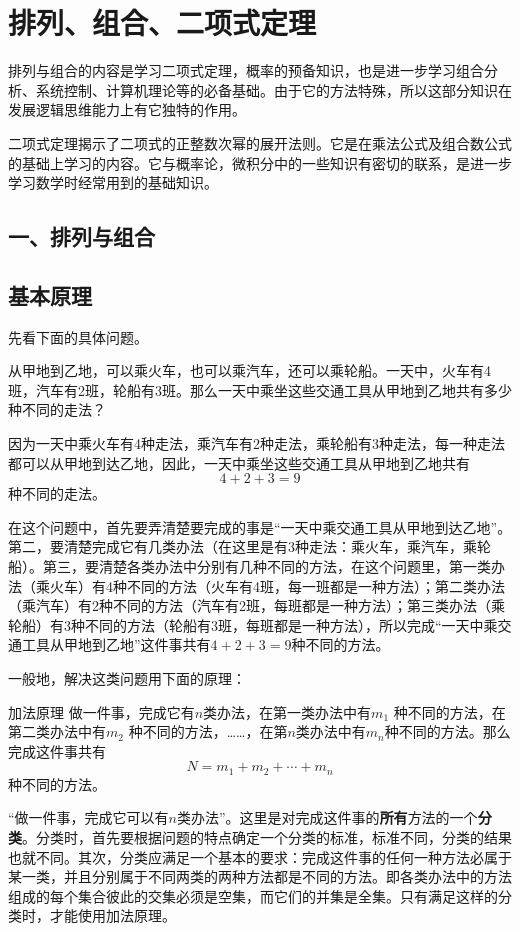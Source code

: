 

\chapter{排列、组合、二项式定理}


排列与组合的内容是学习二项式定理，概率的预备知识，也是进一步学习组合分析、系统控制、计算机理论等的必备基础。由于它的方法特殊，所以这部分知识在发展逻辑思维能力上有它独特的作用。

二项式定理揭示了二项式的正整数次幂的展开法则。它是在乘法公式及组合数公式的基础上学习的内容。它与概率论，微积分中的一些知识有密切的联系，是进一步学习数学时经常用到的基础知识。

\section*{一、排列与组合}

\section{基本原理}

先看下面的具体问题。

从甲地到乙地，可以乘火车，也可以乘汽车，还可以乘轮船。一天中，火车有4班，汽车有2班，轮船有3班。那么一天中乘坐这些交通工具从甲地到乙地共有多少种不同的走法？

因为一天中乘火车有4种走法，乘汽车有2种走法，乘轮船有3种走法，每一种走法都可以从甲地到达乙地，因此，一天中乘坐这些交通工具从甲地到乙地共有
$$4+2+3=9$$种不同的走法。

在这个问题中，首先要弄清楚要完成的事是“一天中乘交通工具从甲地到达乙地”。第二，要清楚完成它有几类办法（在这里是有3种走法：乘火车，乘汽车，乘轮船）。第三，要清楚各类办法中分别有几种不同的方法，在这个问题里，第一类办法（乘火车）有4种不同的方法（火车有4班，每一班都是一种方法）；第二类办法（乘汽车）有2种不同的方法（汽车有2班，每班都是一种方法）；第三类办法（乘轮船）有3种不同的方法（轮船有3班，每班都是一种方法），所以完成“一天中乘交通工具从甲地到乙地”这件事共有$4+2+3  =9$种不同的方法。

一般地，解决这类问题用下面的原理：

\begin{thm}
{加法原理} 做一件事，完成它有$n$类办法，在第一类办法中有$m_{1}$ 种不同的方法，在第二类办法中有$m_{2}$ 种不同的方法，……，在第$n$类办法中有$m_{n}$种不同的方法。那么完成这件事共有    
\[N=m_{1}+m_{2}+\cdots +m_{n}\]
种不同的方法。
\end{thm}

\begin{remark}
“做一件事，完成它可以有$n$类办法”。这里是对完成这件事的\textbf{所有}方法的一个\textbf{分类}。分类时，首先要根据问题的特点确定一个分类的标准，标准不同，分类的结果也就不同。其次，分类应满足一个基本的要求：完成这件事的任何一种方法必属于某一类，并且分别属于不同两类的两种方法都是不同的方法。即各类办法中的方法组成的每个集合彼此的交集必须是空集，而它们的并集是全集。只有满足这样的分类时，才能使用加法原理。    
\end{remark}

